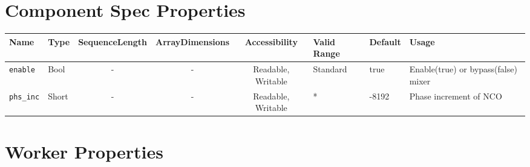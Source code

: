 \begin{landscape}
	\section*{Component Spec Properties}
	\begin{scriptsize}
		\begin{tabular}{|p{3cm}|p{1.5cm}|c|c|c|p{1.5cm}|p{1cm}|p{7cm}|}
			\hline
			\rowcolor{blue}
			Name               & Type   & SequenceLength & ArrayDimensions & Accessibility      & Valid Range & Default & Usage                                                                         \\
			\hline
			\verb+enable+      & Bool   & -              & -               & Readable, Writable & Standard    & true    & Enable(true) or bypass(false) mixer                                           \\
			\hline
			\verb+phs_inc+     & Short  & -              & -               & Readable, Writable & *           & -8192   & Phase increment of NCO \\
			\hline

		\end{tabular}
	\end{scriptsize}

	\section*{Worker Properties}

\end{landscape}
